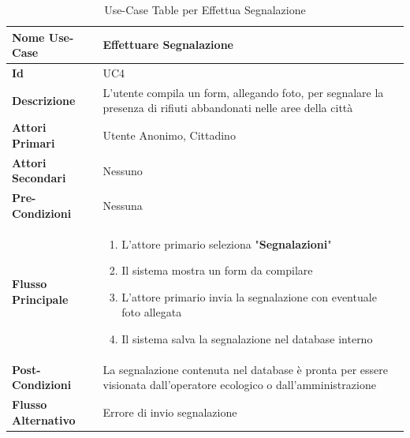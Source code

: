         \begin{table}[h]
            \centering
            \renewcommand{\arraystretch}{1.3} %
            \begin{tabular}{|p{4cm}|p{10cm}|}
                \hline
                \textbf{Nome Use-Case}& \textbf{Effettuare Segnalazione}\\
                \hline
                \textbf{Id} & UC4 \\
                \hline
                \textbf{Descrizione}& L'utente compila un form, allegando foto, per segnalare la presenza di rifiuti abbandonati nelle aree della città\\
                \hline
                \textbf{Attori Primari}& Utente Anonimo, Cittadino\\
                \hline
                \textbf{Attori Secondari}& Nessuno\\
                \hline
                \textbf{Pre-Condizioni}& Nessuna\\
                \hline
                \textbf{Flusso Principale}&
                \begin{enumerate}
                    \item L'attore primario seleziona "\textbf{Segnalazioni}"
                    \item Il sistema mostra un form da compilare
                    \item L'attore primario invia la segnalazione con eventuale foto allegata
                    \item Il sistema salva la segnalazione nel database interno
                \end{enumerate}
                \\
                \hline
                \textbf{Post-Condizioni} & La segnalazione contenuta nel database è pronta per essere visionata dall'operatore ecologico o dall'amministrazione\\
                \hline
                \textbf{Flusso Alternativo}& Errore di invio segnalazione\\
                \hline
            \end{tabular}
            \caption{Use-Case Table per Effettua Segnalazione}
            \label{tab:use_case}
        \end{table}

